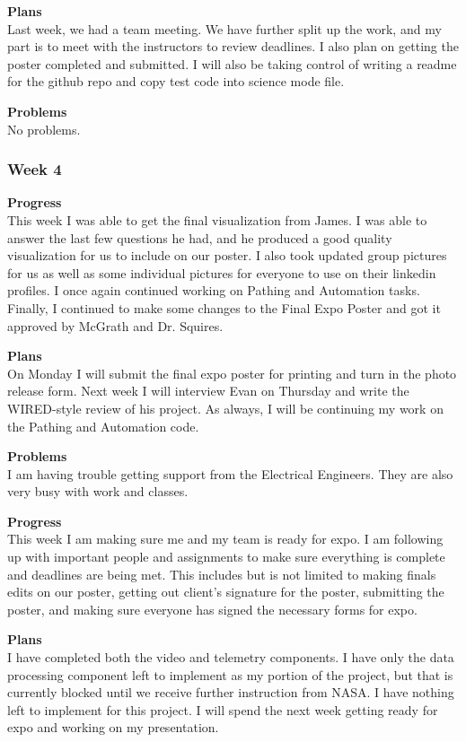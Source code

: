 \textbf{Plans} \\
Last week, we had a team meeting. We have further split up the work, and my part is to meet with the instructors to review deadlines. I also plan on getting the poster completed and submitted. I will also be taking control of writing a readme for the github repo and copy test code into science mode file.

\textbf{Problems} \\
No problems.

\subsubsection{Week 4}
\textbf{Progress} \\ 
This week I was able to get the final visualization from James. I was able to answer the last few questions he had, and he produced a good quality visualization for us to include on our poster. I also took updated group pictures for us as well as some individual pictures for everyone to use on their linkedin profiles. I once again continued working on Pathing and Automation tasks. Finally, I continued to make some changes to the Final Expo Poster and got it approved by McGrath and Dr. Squires.

\textbf{Plans} \\ 
On Monday I will submit the final expo poster for printing and turn in the photo release form. Next week I will interview Evan on Thursday and write the WIRED-style review of his project. As always, I will be continuing my work on the Pathing and Automation code.

\textbf{Problems} \\ 
I am having trouble getting support from the Electrical Engineers. They are also very busy with work and classes.

\textbf{Progress} \\
This week I am making sure me and my team is ready for expo. I am following up with important people and assignments to make sure everything is complete and deadlines are being met. This includes but is not limited to making finals edits on our poster, getting out client's signature for the poster, submitting the poster, and making sure everyone has signed the necessary forms for expo.

\textbf{Plans} \\
I have completed both the video and telemetry components. I have only the data processing component left to implement as my portion of the project, but that is currently blocked until we receive further instruction from NASA. I have nothing left to implement for this project. I will spend the next week getting ready for expo and working on my presentation.

